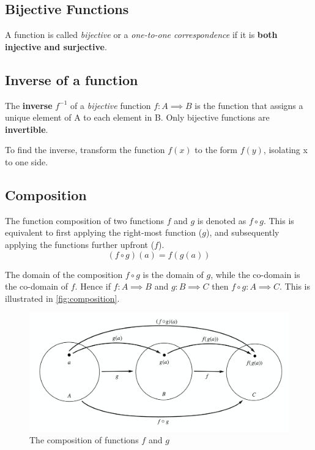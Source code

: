 \subsection{Bijective Functions}
A function is called \emph{bijective} or a \emph{one-to-one correspondence} if it is \textbf{both injective and surjective}. 
\subsection{Inverse of a function}
The \textbf{inverse} \( f^{-1} \) of a \emph{bijective} function \(f:A \implies B \)  is the function that assigns a unique element of A to each element in B. Only bijective functions are \textbf{invertible}.

To find the inverse, transform the function \( f(x) \) to the form \( f(y) \), isolating x to one side.

\subsection{Composition}
The function composition of two functions \( f \) and \( g \) is denoted as \( f \circ g \). This is equivalent to first applying the right-most function (\( g \)), and subsequently applying the functions further upfront (\( f \)). \[
(f \circ g)(a) =  f(g(a))  
\]

The domain of the composition \( f \circ g \) is the domain of \( g \), while the co-domain is the co-domain of \( f \). Hence if \( f: A \implies B \) and \( g: B \implies C\) then \( f \circ g: A \implies C\). This is illustrated in \autoref{fig:composition}.

\begin{figure}[ht]
  \centering
  \includegraphics[width=\textwidth]{composition}
  \caption{The composition of functions \( f \) and \( g \)  }\label{fig:composition}
\end{figure}

